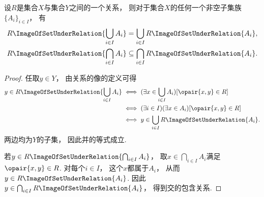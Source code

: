 \begin{theorem}
    设\(R\)是集合\(X\)与集合\(Y\)之间的一个关系，
    则对于集合\(X\)的任何一个非空子集族\(\{A_i\}_{i \in I}\)，
    有
    \begin{gather*}
        R\ImageOfSetUnderRelation{\bigcup_{i \in I} A_i}
        = \bigcup_{i \in I} R\ImageOfSetUnderRelation{A_i}, \\
        R\ImageOfSetUnderRelation{\bigcap_{i \in I} A_i}
        \subseteq \bigcap_{i \in I} R\ImageOfSetUnderRelation{A_i}.
    \end{gather*}
    \begin{proof}
        任取\(y\in Y\)，
        由关系的像的定义可得
        \begin{align*}
            y\in R\ImageOfSetUnderRelation{\bigcup_{i\in I}A_i}
            &\iff(\exists x\in\bigcup_{i\in I}A_i)[\opair{x,y}\in R] \\
            &\iff(\exists i\in I)(\exists x\in A_i)[\opair{x,y}\in R] \\
            &\iff y\in\bigcup_{i\in I}R\ImageOfSetUnderRelation{A_i}.
        \end{align*}
        两边均为\(Y\)的子集，
        因此并的等式成立.

        若\(y\in R\ImageOfSetUnderRelation{\bigcap_{i\in I}A_i}\)，
        取\(x\in\bigcap_{i\in I}A_i\)满足\(\opair{x,y}\in R\).
        对每个\(i\in I\)，
        这个\(x\)都属于\(A_i\)，
        从而\(y\in R\ImageOfSetUnderRelation{A_i}\).
        因此\(y\in\bigcap_{i\in I}R\ImageOfSetUnderRelation{A_i}\)，
        得到交的包含关系.
    \end{proof}
\end{theorem}

